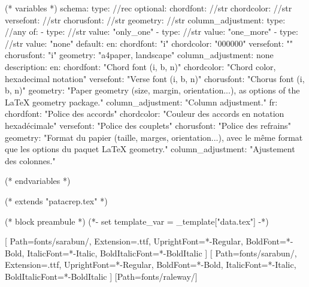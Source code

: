 %
%
%

(* variables *)
schema:
  type: //rec
  optional:
    chordfont: //str
    chordcolor: //str
    versefont: //str
    chorusfont: //str
    geometry: //str
    column_adjustment:
      type: //any
      of:
        - type: //str
          value: "only_one"
        - type: //str
          value: "one_more"
        - type: //str
          value: "none"
default:
  en:
    chordfont: "i"
    chordcolor: "000000"
    versefont: ""
    chorusfont: "i"
    geometry: "a4paper, landscape"
    column_adjustment: none
description:
  en:
    chordfont: "Chord font (i, b, n)"
    chordcolor: "Chord color, hexadecimal notation"
    versefont: "Verse font (i, b, n)"
    chorusfont: "Chorus font (i, b, n)"
    geometry: "Paper geometry (size, margin, orientation...), as options of the LaTeX geometry package."
    column_adjustment: "Column adjustment."
  fr:
    chordfont: "Police des accords"
    chordcolor: "Couleur des accords en notation hexadécimale"
    versefont: "Police des couplets"
    chorusfont: "Police des refrains"
    geometry: "Format du papier (taille, marges, orientation...), avec le même format que les options du paquet LaTeX geometry."
    column_adjustment: "Ajustement des colonnes."


(* endvariables *)

(* extends "patacrep.tex" *)

(* block preambule *)
(*- set template_var = _template["data.tex"] -*)
\usepackage{licence}
\usepackage{guitar-diagrams}

\setmainfont{Sarabun}[
   Path=fonts/sarabun/,
   Extension=.ttf,
   UprightFont=*-Regular,
   BoldFont=*-Bold,
   ItalicFont=*-Italic,
   BoldItalicFont=*-BoldItalic
]
\setsansfont{Sarabun}[
   Path=fonts/sarabun/,
   Extension=.ttf,
   UprightFont=*-Regular,
   BoldFont=*-Bold,
   ItalicFont=*-Italic,
   BoldItalicFont=*-BoldItalic
]
\newfontfamily{}[Path=fonts/raleway/]
\renewcommand{\stitlefont}{\sgdftitlefont\LARGE}
\renewcommand{\idxtitlefont}{\sgdftitlefont}
\makeatletter
\def\@titlefont{\sgdftitlefont\Huge}
\def\@subtitlefont{\sgdftitlefont\large}
\renewcommand{\chorusfont}{%
   (* for letter in template_var.chorusfont *)
   (* if letter=="i" *)   \it %
   (* elif letter=='b' *)   \bf %
   (* elif letter=='n' *)   \normalfont %
   (* endif *)
   (* endfor *)
}

